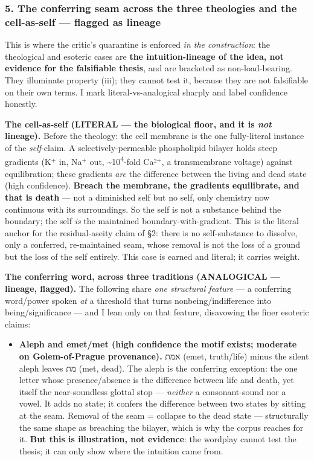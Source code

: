 \documentclass[11pt]{article}
\newcommand{\HE}[1]{{\hebrewfont\beginR #1\endR}}
\begin{document}
\subsubsection*{5. The conferring seam across the three theologies and the cell-as-self — flagged as lineage}

This is where the critic's quarantine is enforced \emph{in the construction}: the theological and esoteric cases are \textbf{the intuition-lineage of the idea, not evidence for the falsifiable thesis}, and are bracketed as non-load-bearing. They illuminate property (iii); they cannot test it, because they are not falsifiable on their own terms. I mark literal-vs-analogical sharply and label confidence honestly.

\textbf{The cell-as-self (LITERAL — the biological floor, and it is \emph{not} lineage).} Before the theology: the cell membrane is the one fully-literal instance of the \emph{self}-claim. A selectively-permeable phospholipid bilayer holds steep gradients (K\ensuremath{^{+}} in, Na\ensuremath{^{+}} out, \textasciitilde{}10\textsuperscript{4}-fold Ca²\ensuremath{^{+}}, a transmembrane voltage) against equilibration; these gradients \emph{are} the difference between the living and dead state (high confidence). \textbf{Breach the membrane, the gradients equilibrate, and that is death} — not a diminished self but no self, only chemistry now continuous with its surroundings. So the self is not a substance behind the boundary; the self \emph{is} the maintained boundary-with-gradient. This is the literal anchor for the residual-aseity claim of §2: there is no self-substance to dissolve, only a conferred, re-maintained seam, whose removal is not the loss of a ground but the loss of the self entirely. This case is earned and literal; it carries weight.

\textbf{The conferring word, across three traditions (ANALOGICAL — lineage, flagged).} The following share \emph{one structural feature} — a conferring word/\allowbreak{}power spoken \emph{at} a threshold that turns nonbeing/\allowbreak{}indifference into being/\allowbreak{}significance — and I lean only on that feature, disavowing the finer esoteric claims:

\begin{itemize}
\item \textbf{Aleph and emet/\allowbreak{}met (high confidence the motif exists; moderate on Golem-of-Prague provenance).} \HE{אמת} (emet, truth/\allowbreak{}life) minus the silent aleph leaves \HE{מת} (met, dead). The aleph is the conferring exception: the one letter whose presence/\allowbreak{}absence is the difference between life and death, yet itself the near-soundless glottal stop — \emph{neither} a consonant-sound nor a vowel. It adds no state; it confers the difference between two states by sitting at the seam. Removal of the seam = collapse to the dead state — structurally the same shape as breaching the bilayer, which is why the corpus reaches for it. \textbf{But this is illustration, not evidence}: the wordplay cannot test the thesis; it can only show where the intuition came from.
\end{itemize}
\end{document}
